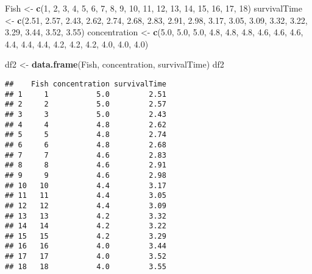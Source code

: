 \documentclass[
]{article}
\newenvironment{Shaded}{\begin{snugshade}}{\end{snugshade}}
\newcommand{\DecValTok}[1]{\textcolor[rgb]{0.00,0.00,0.81}{#1}}
\newcommand{\FloatTok}[1]{\textcolor[rgb]{0.00,0.00,0.81}{#1}}
\newcommand{\KeywordTok}[1]{\textcolor[rgb]{0.13,0.29,0.53}{\textbf{#1}}}
\newcommand{\NormalTok}[1]{#1}
\newcommand{\StringTok}[1]{\textcolor[rgb]{0.31,0.60,0.02}{#1}}
\begin{document}
\begin{Shaded}
\begin{Highlighting}[]
\NormalTok{Fish <-}\StringTok{ }\KeywordTok{c}\NormalTok{(}\DecValTok{1}\NormalTok{, }\DecValTok{2}\NormalTok{, }\DecValTok{3}\NormalTok{, }\DecValTok{4}\NormalTok{, }\DecValTok{5}\NormalTok{, }\DecValTok{6}\NormalTok{, }\DecValTok{7}\NormalTok{, }\DecValTok{8}\NormalTok{, }\DecValTok{9}\NormalTok{, }\DecValTok{10}\NormalTok{, }\DecValTok{11}\NormalTok{, }\DecValTok{12}\NormalTok{, }\DecValTok{13}\NormalTok{, }\DecValTok{14}\NormalTok{, }\DecValTok{15}\NormalTok{, }\DecValTok{16}\NormalTok{, }\DecValTok{17}\NormalTok{, }\DecValTok{18}\NormalTok{)}
\NormalTok{survivalTime <-}\StringTok{ }\KeywordTok{c}\NormalTok{(}\FloatTok{2.51}\NormalTok{, }\FloatTok{2.57}\NormalTok{, }\FloatTok{2.43}\NormalTok{, }\FloatTok{2.62}\NormalTok{, }\FloatTok{2.74}\NormalTok{, }\FloatTok{2.68}\NormalTok{, }\FloatTok{2.83}\NormalTok{, }\FloatTok{2.91}\NormalTok{, }\FloatTok{2.98}\NormalTok{, }\FloatTok{3.17}\NormalTok{, }\FloatTok{3.05}\NormalTok{, }\FloatTok{3.09}\NormalTok{, }\FloatTok{3.32}\NormalTok{, }\FloatTok{3.22}\NormalTok{, }\FloatTok{3.29}\NormalTok{, }\FloatTok{3.44}\NormalTok{, }\FloatTok{3.52}\NormalTok{, }\FloatTok{3.55}\NormalTok{)}
\NormalTok{concentration <-}\StringTok{ }\KeywordTok{c}\NormalTok{(}\FloatTok{5.0}\NormalTok{, }\FloatTok{5.0}\NormalTok{, }\FloatTok{5.0}\NormalTok{, }\FloatTok{4.8}\NormalTok{, }\FloatTok{4.8}\NormalTok{, }\FloatTok{4.8}\NormalTok{, }\FloatTok{4.6}\NormalTok{, }\FloatTok{4.6}\NormalTok{, }\FloatTok{4.6}\NormalTok{, }\FloatTok{4.4}\NormalTok{, }\FloatTok{4.4}\NormalTok{, }\FloatTok{4.4}\NormalTok{, }\FloatTok{4.2}\NormalTok{, }\FloatTok{4.2}\NormalTok{, }\FloatTok{4.2}\NormalTok{, }\FloatTok{4.0}\NormalTok{, }\FloatTok{4.0}\NormalTok{, }\FloatTok{4.0}\NormalTok{)}

\NormalTok{df2 <-}\StringTok{ }\KeywordTok{data.frame}\NormalTok{(Fish, concentration, survivalTime)}
\NormalTok{df2}
\end{Highlighting}
\end{Shaded}

\begin{verbatim}
##    Fish concentration survivalTime
## 1     1           5.0         2.51
## 2     2           5.0         2.57
## 3     3           5.0         2.43
## 4     4           4.8         2.62
## 5     5           4.8         2.74
## 6     6           4.8         2.68
## 7     7           4.6         2.83
## 8     8           4.6         2.91
## 9     9           4.6         2.98
## 10   10           4.4         3.17
## 11   11           4.4         3.05
## 12   12           4.4         3.09
## 13   13           4.2         3.32
## 14   14           4.2         3.22
## 15   15           4.2         3.29
## 16   16           4.0         3.44
## 17   17           4.0         3.52
## 18   18           4.0         3.55
\end{verbatim}
\end{document}
